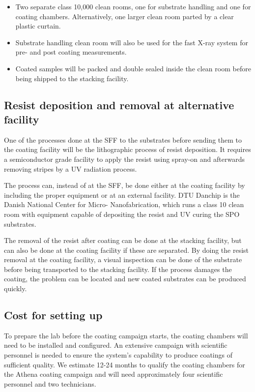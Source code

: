 \begin{itemize}
	\item Two separate class 10,000 clean rooms, one for substrate handling and one for coating chambers. Alternatively, one larger clean room parted by a clear plastic curtain.
	\item Substrate handling clean room will also be used for the fast X-ray system for pre- and post coating measurements.
	\item Coated samples will be packed and double sealed inside the clean room before being shipped to the stacking facility.
\end{itemize}

\subsection{Resist deposition and removal at alternative facility}
One of the processes done at the SFF to the substrates before sending them to the coating facility will be the lithographic process of resist deposition. It requires a semiconductor grade facility to apply the resist using spray-on and afterwards removing stripes by a UV radiation process.

The process can, instead of at the SFF, be done either at the coating facility by including the proper equipment or at an external facility. DTU Danchip is the Danish National Center for Micro- Nanofabrication, which runs a class 10 clean room with equipment capable of depositing the resist and UV curing the SPO substrates.

The removal of the resist after coating can be done at the stacking facility, but can also be done at the coating facility if these are separated. By doing the resist removal at the coating facility, a visual inspection can be done of the substrate before being transported to the stacking facility. If the process damages the coating, the problem can be located and new coated substrates can be produced quickly.


\subsection{Cost for setting up}
To prepare the lab before the coating campaign starts, the coating chambers will need to be installed and configured. An extensive campaign with scientific personnel is needed to ensure the system's capability to produce coatings of sufficient quality. We estimate 12-24 months to qualify the coating chambers for the Athena coating campaign and will need approximately four scientific personnel and two technicians.

